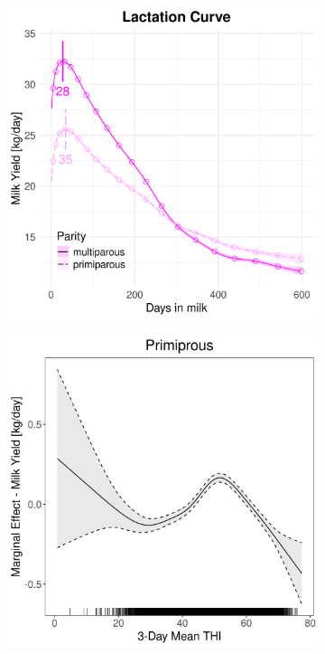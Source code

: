 \begin{figure}[H]
\begin{subfigure}[b]{0.45\textwidth}
        \includegraphics[width=\textwidth]{thesis/figures/models/milk/after2010/sf_milk_after2010/sf_milk_after2010_marginal_dim_milk_combined.png}
    \end{subfigure}
    \begin{subfigure}[b]{0.45\textwidth}
        \centering
        \includegraphics[width=\textwidth]{thesis/figures/models/milk/after2010/sf_milk_after2010/sf_milk_after2010_marginal_thi_milk_primi.png}

\end{subfigure}
\end{figure}
